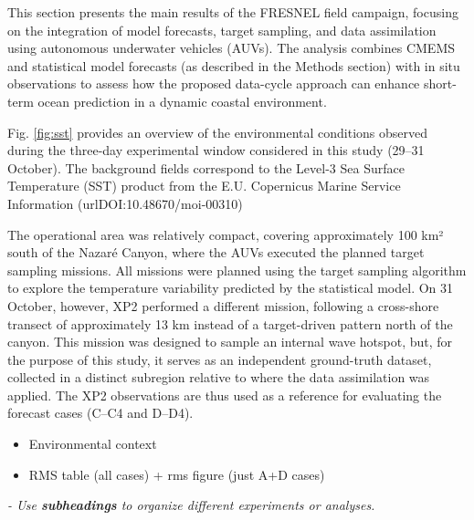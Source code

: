 \begin{figure}
  \centering 



\end{figure}

This section presents the main results of the FRESNEL field campaign,
focusing on the integration of model forecasts, target sampling, and
data assimilation using autonomous underwater vehicles (AUVs). The
analysis combines CMEMS and statistical model forecasts (as described
in the Methods section) with in situ observations to assess how the
proposed data-cycle approach can enhance short-term ocean prediction
in a dynamic coastal environment.

Fig. \ref{fig:sst} provides an overview of the environmental
conditions observed during the three-day experimental window
considered in this study (29–31 October). The background fields
correspond to the Level-3 Sea Surface Temperature (SST) product from
the E.U. Copernicus Marine Service Information
(url{DOI:10.48670/moi-00310})


The operational area was relatively compact, covering approximately
100 km² south of the Nazaré Canyon, where the AUVs executed the
planned target sampling missions. All missions were planned using the
target sampling algorithm to explore the temperature variability
predicted by the statistical model. On 31 October, however, XP2
performed a different mission, following a cross-shore transect of
approximately 13 km instead of a target-driven pattern north of the
canyon. This mission was designed to sample an internal wave hotspot,
but, for the purpose of this study, it serves as an independent
ground-truth dataset, collected in a distinct subregion relative to
where the data assimilation was applied. The XP2 observations are thus
used as a reference for evaluating the forecast cases (C–C4 and D–D4).

\begin{itemize}
    \item Environmental context
    
    \item RMS table (all cases) + rms figure (just A+D cases)
\end{itemize}

 
\textit{- Use \textbf{subheadings} to organize different experiments or analyses.}
